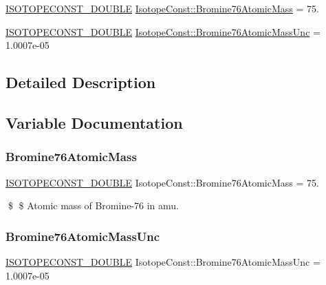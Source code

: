 \begin{DoxyCompactItemize}
\item 
\mbox{\hyperlink{group___isotope_const-_macros_ga8f45a7272ce02c0b4c65c44636ed719a}{I\+S\+O\+T\+O\+P\+E\+C\+O\+N\+S\+T\+\_\+\+D\+O\+U\+B\+LE}} \mbox{\hyperlink{group___isotope_const-_bromine-_br76_ga2c22019294191c458ddab13bb3b42a13}{Isotope\+Const\+::\+Bromine76\+Atomic\+Mass}} = 75.
\item 
\mbox{\hyperlink{group___isotope_const-_macros_ga8f45a7272ce02c0b4c65c44636ed719a}{I\+S\+O\+T\+O\+P\+E\+C\+O\+N\+S\+T\+\_\+\+D\+O\+U\+B\+LE}} \mbox{\hyperlink{group___isotope_const-_bromine-_br76_ga5aa658cb0bc8c344f64cd15f61f1ad97}{Isotope\+Const\+::\+Bromine76\+Atomic\+Mass\+Unc}} = 1.\+0007e-\/05
\end{DoxyCompactItemize}


\subsection{Detailed Description}


\subsection{Variable Documentation}
\mbox{\label{group___isotope_const-_bromine-_br76_ga2c22019294191c458ddab13bb3b42a13}} 
\subsubsection{\texorpdfstring{Bromine76\+Atomic\+Mass}{Bromine76AtomicMass}}
{\footnotesize\ttfamily \mbox{\hyperlink{group___isotope_const-_macros_ga8f45a7272ce02c0b4c65c44636ed719a}{I\+S\+O\+T\+O\+P\+E\+C\+O\+N\+S\+T\+\_\+\+D\+O\+U\+B\+LE}} Isotope\+Const\+::\+Bromine76\+Atomic\+Mass = 75.}

\$ \$ Atomic mass of Bromine-\/76 in amu. \mbox{\label{group___isotope_const-_bromine-_br76_ga5aa658cb0bc8c344f64cd15f61f1ad97}} 
\subsubsection{\texorpdfstring{Bromine76\+Atomic\+Mass\+Unc}{Bromine76AtomicMassUnc}}
{\footnotesize\ttfamily \mbox{\hyperlink{group___isotope_const-_macros_ga8f45a7272ce02c0b4c65c44636ed719a}{I\+S\+O\+T\+O\+P\+E\+C\+O\+N\+S\+T\+\_\+\+D\+O\+U\+B\+LE}} Isotope\+Const\+::\+Bromine76\+Atomic\+Mass\+Unc = 1.\+0007e-\/05}

